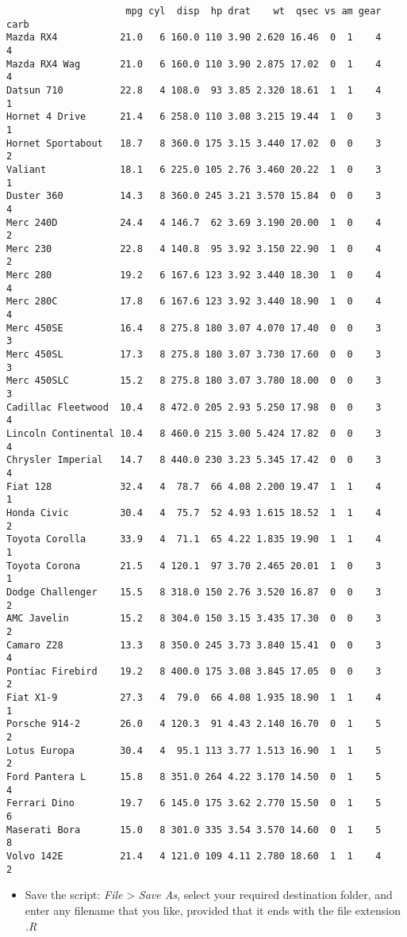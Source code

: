 \documentclass[
  letterpaper,
  krantz2]{style/krantz}
\providecommand{\tightlist}{%
  \setlength{\itemsep}{0pt}\setlength{\parskip}{0pt}}\usepackage{longtable,booktabs,array}
\begin{document}
\begin{verbatim}
                     mpg cyl  disp  hp drat    wt  qsec vs am gear carb
Mazda RX4           21.0   6 160.0 110 3.90 2.620 16.46  0  1    4    4
Mazda RX4 Wag       21.0   6 160.0 110 3.90 2.875 17.02  0  1    4    4
Datsun 710          22.8   4 108.0  93 3.85 2.320 18.61  1  1    4    1
Hornet 4 Drive      21.4   6 258.0 110 3.08 3.215 19.44  1  0    3    1
Hornet Sportabout   18.7   8 360.0 175 3.15 3.440 17.02  0  0    3    2
Valiant             18.1   6 225.0 105 2.76 3.460 20.22  1  0    3    1
Duster 360          14.3   8 360.0 245 3.21 3.570 15.84  0  0    3    4
Merc 240D           24.4   4 146.7  62 3.69 3.190 20.00  1  0    4    2
Merc 230            22.8   4 140.8  95 3.92 3.150 22.90  1  0    4    2
Merc 280            19.2   6 167.6 123 3.92 3.440 18.30  1  0    4    4
Merc 280C           17.8   6 167.6 123 3.92 3.440 18.90  1  0    4    4
Merc 450SE          16.4   8 275.8 180 3.07 4.070 17.40  0  0    3    3
Merc 450SL          17.3   8 275.8 180 3.07 3.730 17.60  0  0    3    3
Merc 450SLC         15.2   8 275.8 180 3.07 3.780 18.00  0  0    3    3
Cadillac Fleetwood  10.4   8 472.0 205 2.93 5.250 17.98  0  0    3    4
Lincoln Continental 10.4   8 460.0 215 3.00 5.424 17.82  0  0    3    4
Chrysler Imperial   14.7   8 440.0 230 3.23 5.345 17.42  0  0    3    4
Fiat 128            32.4   4  78.7  66 4.08 2.200 19.47  1  1    4    1
Honda Civic         30.4   4  75.7  52 4.93 1.615 18.52  1  1    4    2
Toyota Corolla      33.9   4  71.1  65 4.22 1.835 19.90  1  1    4    1
Toyota Corona       21.5   4 120.1  97 3.70 2.465 20.01  1  0    3    1
Dodge Challenger    15.5   8 318.0 150 2.76 3.520 16.87  0  0    3    2
AMC Javelin         15.2   8 304.0 150 3.15 3.435 17.30  0  0    3    2
Camaro Z28          13.3   8 350.0 245 3.73 3.840 15.41  0  0    3    4
Pontiac Firebird    19.2   8 400.0 175 3.08 3.845 17.05  0  0    3    2
Fiat X1-9           27.3   4  79.0  66 4.08 1.935 18.90  1  1    4    1
Porsche 914-2       26.0   4 120.3  91 4.43 2.140 16.70  0  1    5    2
Lotus Europa        30.4   4  95.1 113 3.77 1.513 16.90  1  1    5    2
Ford Pantera L      15.8   8 351.0 264 4.22 3.170 14.50  0  1    5    4
Ferrari Dino        19.7   6 145.0 175 3.62 2.770 15.50  0  1    5    6
Maserati Bora       15.0   8 301.0 335 3.54 3.570 14.60  0  1    5    8
Volvo 142E          21.4   4 121.0 109 4.11 2.780 18.60  1  1    4    2
\end{verbatim}

\begin{itemize}
\tightlist
\item
  Save the script: \emph{File} \textgreater{} \emph{Save As}, select
  your required destination folder, and enter any filename that you
  like, provided that it ends with the file extension \emph{.R}
\end{itemize}
\end{document}
